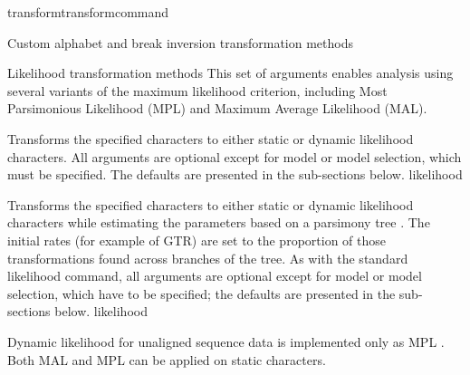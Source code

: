 \begin{command}{transform}{transformcommand}
\begin{arguments}
\begin{argumentgroup}{Custom alphabet and break inversion transformation methods}
        \end{argumentgroup}
       

        \begin{argumentgroup}{Likelihood transformation methods}
            This set of arguments enables analysis using several variants of the
            maximum likelihood criterion, including Most Parsimonious Likelihood (MPL)
            and Maximum Average Likelihood (MAL). 

                {Transforms the specified characters to either static or dynamic
                likelihood characters. All arguments are optional except for model or model selection, 
                which must  be specified.  The defaults are presented in the sub-sections below.}
                {likelihood}

                {Transforms the specified characters to either static or dynamic
                likelihood characters while estimating the parameters based on a
                parsimony tree \cite{wheeler2013}. The initial rates (for example of 
                GTR) are set to the proportion of those transformations found
                across branches of the tree. As with the standard likelihood command,
                all arguments are optional except for model  or model selection, which 
                have to be specified; the defaults are presented in the sub-sections below.}
                {likelihood}

            \begin{statement}
                Dynamic likelihood for unaligned sequence data is
                implemented only as MPL \cite{barryandhartigan1987}. Both MAL and
                MPL can be applied on static characters.
            \end{statement}


\end{argumentgroup}
\end{arguments}
\end{command}
